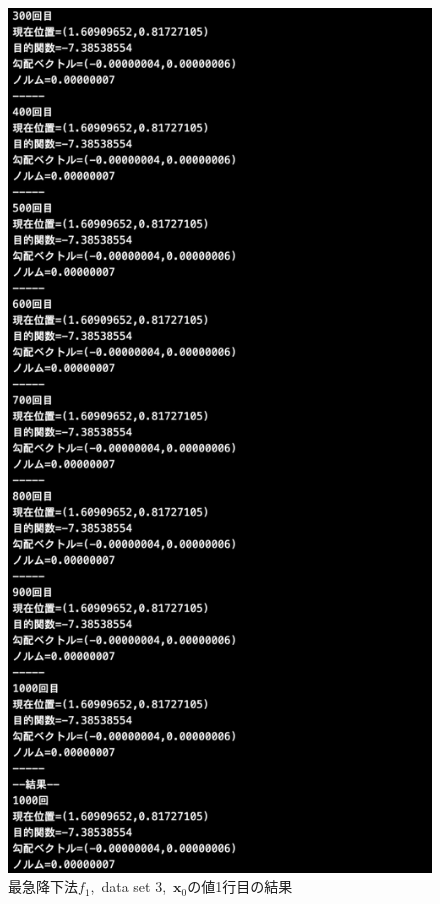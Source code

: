 \documentclass[12pt]{jarticle}
\begin{document}
\begin{figure}[h]
\begin{minipage}{0.5\hsize}
    \end{minipage}
    \begin{minipage}{0.5\hsize}
        \begin{center}
            \includegraphics[scale=0.2]{kadai1_1s_out3_1_3.png}
        \end{center}
    \end{minipage}
    \caption{最急降下法$f_1$,\ data set 3,\ $\boldsymbol{x}_0$の値1行目の結果}
\end{figure}
\end{document}
